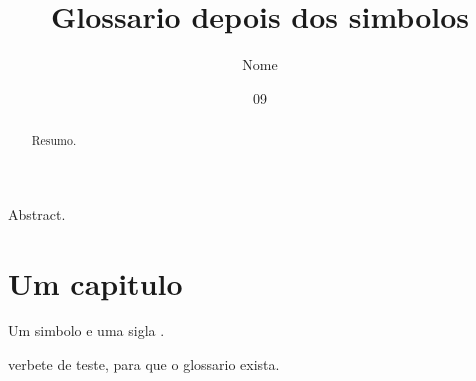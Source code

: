 \documentclass[dsc]{ufrj}
\title{Glossario depois dos simbolos}
\author{Nome}{Sobrenome}
\date{09}{2026}
\begin{document}
  \maketitle
  \frontmatter
  \begin{abstract}Resumo.\end{abstract}
  \begin{foreignabstract}Abstract.\end{foreignabstract}
  \printloabbreviations
  \printlosymbols
  \tableofcontents
  \mainmatter
  \chapter{Um capitulo}
  Um simbolo  e uma sigla
  .
  \backmatter
  \begin{theglossary}
    \item[Adversativo] verbete de teste, para que o glossario exista.
  \end{theglossary}
\end{document}
